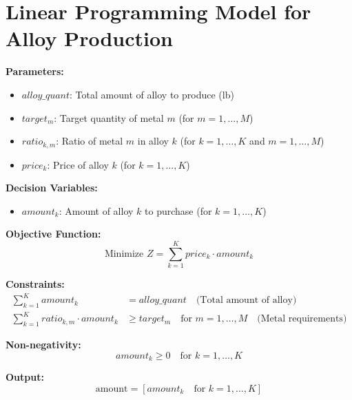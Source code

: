 \documentclass{article}
\begin{document}
\section*{Linear Programming Model for Alloy Production}

\textbf{Parameters:}
\begin{itemize}
    \item \( alloy\_quant \): Total amount of alloy to produce (lb)
    \item \( target_m \): Target quantity of metal \( m \) (for \( m = 1, \ldots, M \))
    \item \( ratio_{k,m} \): Ratio of metal \( m \) in alloy \( k \) (for \( k = 1, \ldots, K \) and \( m = 1, \ldots, M \))
    \item \( price_k \): Price of alloy \( k \) (for \( k = 1, \ldots, K \))
\end{itemize}

\textbf{Decision Variables:}
\begin{itemize}
    \item \( amount_k \): Amount of alloy \( k \) to purchase (for \( k = 1, \ldots, K \))
\end{itemize}

\textbf{Objective Function:}
\[
\text{Minimize } Z = \sum_{k=1}^{K} price_k \cdot amount_k
\]

\textbf{Constraints:}
\begin{align*}
\sum_{k=1}^{K} amount_k &= alloy\_quant \quad \text{(Total amount of alloy)} \\
\sum_{k=1}^{K} ratio_{k,m} \cdot amount_k &\geq target_m \quad \text{for } m = 1, \ldots, M \quad \text{(Metal requirements)}
\end{align*}

\textbf{Non-negativity:}
\[
amount_k \geq 0 \quad \text{for } k = 1, \ldots, K
\]

\textbf{Output:}
\[
\text{amount} = [amount_k \quad \text{for } k = 1, \ldots, K]
\]
\end{document}
